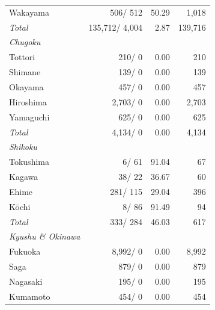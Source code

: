\documentclass[
  letterpaper,
  DIV=11,
  numbers=noendperiod]{scrartcl}
\begin{document}
\begin{table}[htbp]
\begin{tabular}{lrrr}
\hspace{1em}Wakayama    & 506/ 512      & 50.29 & 1,018   \\
\hspace{1em}\textit{Total}       & 135,712/ 4,004& 2.87  & 139,716 \\
\addlinespace
\textit{Chugoku} & & & \\
\hspace{1em}Tottori     & 210/ 0        & 0.00  & 210     \\
\hspace{1em}Shimane     & 139/ 0        & 0.00  & 139     \\
\hspace{1em}Okayama     & 457/ 0        & 0.00  & 457     \\
\hspace{1em}Hiroshima   & 2,703/ 0      & 0.00  & 2,703   \\
\hspace{1em}Yamaguchi   & 625/ 0        & 0.00  & 625     \\
\hspace{1em}\textit{Total}       & 4,134/ 0      & 0.00  & 4,134   \\
\addlinespace
\textit{Shikoku} & & & \\
\hspace{1em}Tokushima   & 6/ 61         & 91.04 & 67      \\
\hspace{1em}Kagawa      & 38/ 22        & 36.67 & 60      \\
\hspace{1em}Ehime       & 281/ 115      & 29.04 & 396     \\
\hspace{1em}Kōchi       & 8/ 86         & 91.49 & 94      \\
\hspace{1em}\textit{Total}       & 333/ 284      & 46.03 & 617     \\
\addlinespace
\textit{Kyushu \& Okinawa} & & & \\
\hspace{1em}Fukuoka     & 8,992/ 0      & 0.00  & 8,992   \\
\hspace{1em}Saga        & 879/ 0        & 0.00  & 879     \\
\hspace{1em}Nagasaki    & 195/ 0        & 0.00  & 195     \\
\hspace{1em}Kumamoto    & 454/ 0        & 0.00  & 454     \\

\end{tabular}
\end{table}
\end{document}
